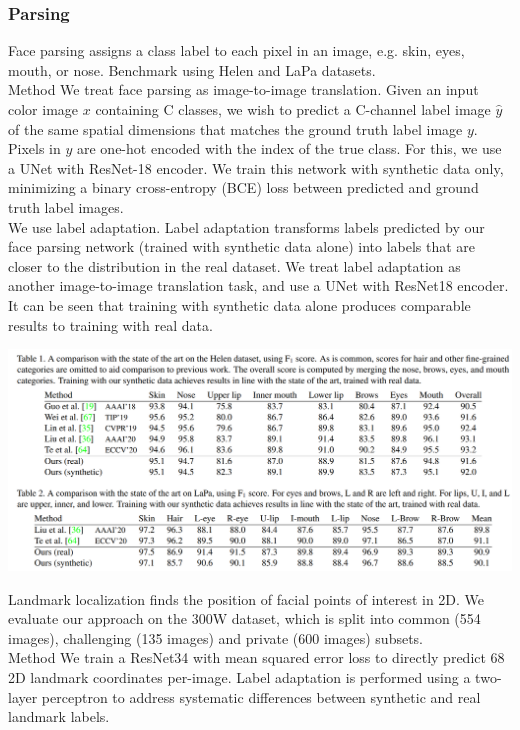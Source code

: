\documentclass[12pt]{article}
\begin{document}
\subsubsection{Parsing}
Face parsing assigns a class label to each pixel in an
image, e.g. skin, eyes, mouth, or nose. Benchmark using Helen and LaPa datasets.\\
Method We treat face parsing as image-to-image translation. Given an input color image $x$ containing C classes,
we wish to predict a C-channel label image $\hat{y}$ of the same
spatial dimensions that matches the ground truth label image $y$. Pixels in $y$ are one-hot encoded with the index of the
true class. For this, we use a UNet with ResNet-18
encoder. We train this network with synthetic data
only, minimizing a binary cross-entropy (BCE) loss between
predicted and ground truth label images.\\
We use label adaptation. Label adaptation transforms labels
predicted by our face parsing network (trained with synthetic
data alone) into labels that are closer to the distribution in
the real dataset. We treat label adaptation
as another image-to-image translation task, and use a UNet
with ResNet18 encoder.\\
It can be seen that training
with synthetic data alone produces comparable results to
training with real data.
\begin{center}
\includegraphics[scale = 0.7]{img1.png}
\end{center}
Landmark localization finds the position of facial points
of interest in 2D. We evaluate our approach on the
300W dataset, which is split into common (554 images), challenging (135 images) and private (600 images)
subsets.\\
Method We train a ResNet34 with mean squared
error loss to directly predict 68 2D landmark coordinates
per-image. Label adaptation is performed using a two-layer perceptron to address systematic differences between synthetic
and real landmark labels.\\
\end{document}
